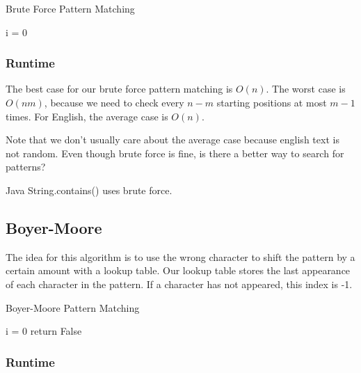 \documentclass[a4paper]{article}
\begin{document}
\begin{algorithm}[H]
	\caption{Brute Force Pattern Matching}
	i = 0\;
\end{algorithm}

\subsubsection{Runtime}
The best case for our brute force pattern matching is \( O(n) \). The worst case is \( O(nm) \), because we need to check every \( n-m \) starting positions at most \( m-1 \) times. For English, the average case is \( O(n) \). 

Note that we don't usually care about the average case because english text is not random. Even though brute force is fine, is there a better way to search for patterns?

\begin{note}
	Java String.contains() uses brute force.
\end{note}

\subsection{Boyer-Moore}

The idea for this algorithm is to use the wrong character to shift the pattern by a certain amount with a lookup table. Our lookup table stores the last appearance of each character in the pattern. If a character has not appeared, this index is -1.

\begin{algorithm}[H]
	\caption{Boyer-Moore Pattern Matching}
	i = 0\;
	return False\;
\end{algorithm}


\subsubsection{Runtime}
\end{document}
